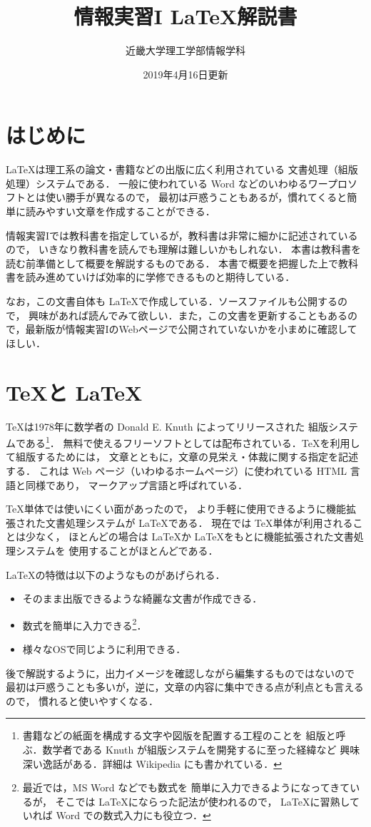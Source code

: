 \documentclass[a4j]{jsarticle}
\begin{document}
\title{情報実習I \LaTeX 解説書}
\date{2019年4月16日更新}
\author{近畿大学理工学部情報学科}

\maketitle

\section{はじめに}

\LaTeX は理工系の論文・書籍などの出版に広く利用されている
文書処理（組版処理）システムである．
一般に使われている Word などのいわゆるワープロソフトとは使い勝手が異なるので，
最初は戸惑うこともあるが，慣れてくると簡単に読みやすい文章を作成することができる．

情報実習Iでは教科書\cite{TeXText}を指定しているが，教科書は非常に細かに記述されているので，
いきなり教科書を読んでも理解は難しいかもしれない．
本書は教科書を読む前準備として概要を解説するものである．
本書で概要を把握した上で教科書を読み進めていけば効率的に学修できるものと期待している．

なお，この文書自体も \LaTeX で作成している．ソースファイルも公開するので，
興味があれば読んでみて欲しい．また，この文書を更新することもあるので，最新版が情報実習IのWebページで公開されていないかを小まめに確認してほしい．

\section{\TeX と \LaTeX}
\label{sec:TeXandLaTeX}

\TeX は1978年に数学者の Donald E. Knuth によってリリースされた
組版システムである\footnote{書籍などの紙面を構成する文字や図版を配置する工程のことを
組版と呼ぶ．数学者である Knuth が組版システムを開発するに至った経緯など
興味深い逸話がある．詳細は Wikipedia にも書かれている．}．
無料で使えるフリーソフトとしては配布されている．TeXを利用して組版するためには，
文章とともに，文章の見栄え・体裁に関する指定を記述する．
これは Web ページ（いわゆるホームページ）に使われている HTML 言語と同様であり，
マークアップ言語と呼ばれている．

\TeX 単体では使いにくい面があったので，
より手軽に使用できるように機能拡張された文書処理システムが \LaTeX である．
現在では \TeX 単体が利用されることは少なく，
ほとんどの場合は \LaTeX か \LaTeX をもとに機能拡張された文書処理システムを
使用することがほとんどである．

\LaTeX の特徴は以下のようなものがあげられる．
\begin{itemize}
\item そのまま出版できるような綺麗な文書が作成できる．
\item 数式を簡単に入力できる\footnote{最近では，MS Word などでも数式を
簡単に入力できるようになってきているが，
そこでは \LaTeX にならった記法が使われるので，
\LaTeX に習熟していれば Word での数式入力にも役立つ．}．
\item 様々なOSで同じように利用できる．
\end{itemize}
後で解説するように，出力イメージを確認しながら編集するものではないので
最初は戸惑うことも多いが，逆に，文章の内容に集中できる点が利点とも言えるので，
慣れると使いやすくなる．
\end{document}
